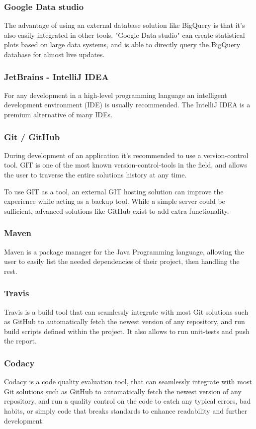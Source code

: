 \documentclass[a4paper]{article}
\begin{document}
\subsubsection{Google Data studio}
The advantage of using an external database solution like BigQuery is that it's also easily
integrated in other tools. "Google Data studio" can create statistical plots based on large
data systems, and is able to directly query the BigQuery database for almost live updates.

\subsubsection{JetBrains - IntelliJ IDEA}
For any development in a high-level programming language an intelligent development environment
(IDE) is usually recommended. The IntelliJ IDEA is a premium alternative of many IDEs.

\subsubsection{Git / GitHub}
During development of an application it's recommended to use a version-control tool. GIT is
one of the most known version-control-tools in the field, and allows the user to traverse
the entire solutions history at any time.


To use GIT as a tool, an external GIT hosting solution can improve the experience while acting
as a backup tool. While a simple server could be sufficient, advanced solutions like GitHub
exist to add extra functionality.

\subsubsection{Maven}
Maven is a package manager for the Java Programming language, allowing the user to easily
list the needed dependencies of their project, then handling the rest.

\subsubsection{Travis}
Travis is a build tool that can seamlessly integrate with most Git solutions such as GitHub
to automatically fetch the newest version of any repository, and run build scripts defined
within the project. It also allows to run unit-tests and push the report.

\subsubsection{Codacy}
Codacy is a code quality evaluation tool, that can seamlessly integrate with most Git
solutions such as GitHub to automatically fetch the newest version of any repository,
and run a quality control on the code to catch any typical errors, bad habits, or
simply code that breaks standards to enhance readability and further development.
\end{document}
